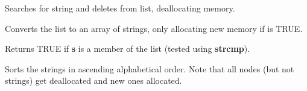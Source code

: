 Searches for string and deletes from list, deallocating memory.



Converts the list to an array of strings, only allocating new memory if
 is TRUE.



Returns TRUE if {\bf s} is a member of the list (tested using {\bf strcmp}).



Sorts the strings in ascending alphabetical order. Note that all nodes
(but not strings) get deallocated and new ones allocated.


